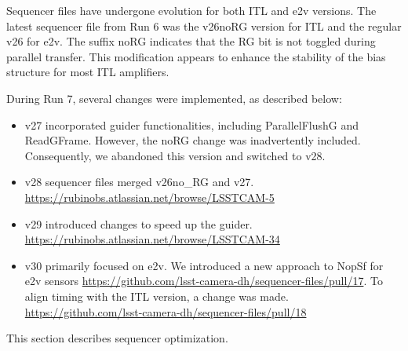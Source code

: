 Sequencer files have undergone evolution for both ITL and e2v versions.
The latest sequencer file from Run 6 was the
v26\label{norg}{noRG} version for ITL and the regular v26
for e2v. The suffix \label{norg}{noRG} indicates that the
RG bit is not toggled during parallel transfer. This modification
appears to enhance the stability of the bias structure for most ITL
amplifiers.

During Run 7, several changes were implemented, as described below:

\begin{itemize}
\tightlist
\item
  v27 incorporated guider functionalities, including ParallelFlushG and
  ReadGFrame. However, the noRG change was inadvertently included.
  Consequently, we abandoned this version and switched to v28.
\item
  v28 sequencer files merged v26\label{no_rg}{no\_RG} and
  v27. \url{https://rubinobs.atlassian.net/browse/LSSTCAM-5}
\item
  v29 introduced changes to speed up the guider.
  \url{https://rubinobs.atlassian.net/browse/LSSTCAM-34}
\item
  v30 primarily focused on e2v. We introduced a new approach to NopSf
  for e2v sensors
  \url{https://github.com/lsst-camera-dh/sequencer-files/pull/17}. To
  align timing with the ITL version, a change was made.
  \url{https://github.com/lsst-camera-dh/sequencer-files/pull/18}
\end{itemize}

This section describes sequencer optimization.

